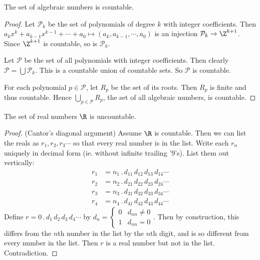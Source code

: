 \documentclass[a4paper]{article}
\begin{document}
  \begin{thm}
    The set of algebraic numbers is countable.
  \end{thm}
  \begin{proof}
    Let $\mathcal{P}_k$ be the set of polynomials of degree $k$ with integer coefficients. Then  $a_kx^k + a_{k - 1}x^{k - 1} + \cdots + a_0 \mapsto (a_k, a_{k - 1}, \cdots, a_0)$ is an injection $\mathcal{P}_k \to \Z^{k + 1}$. Since $\Z^{k + 1}$ is countable, so is $\mathcal{P}_k$.

    Let $\mathcal{P}$ be the set of all polynomials with integer coefficients. Then clearly $\mathcal{P} = \bigcup \mathcal{P}_k$. This is a countable union of countable sets. So $\mathcal{P}$ is countable.

    For each polynomial $p \in \mathcal{P}$, let $R_p$ be the set of its roots. Then $R_p$ is finite and thus countable. Hence $\bigcup_{p\in \mathcal{P}} R_p$, the set of all algebraic numbers, is countable.
  \end{proof}

  \begin{thm}
    The set of real numbers $\R$ is uncountable. 
  \end{thm}

  \begin{proof}
    (Cantor's diagonal argument) Assume $\R$ is countable. Then we can list the reals as $r_1,r_2,r_3\cdots$ so that every real number is in the list. Write each $r_n$ uniquely in decimal form (ie. without infinite trailing '9's). List them out vertically:
    \begin{align*}
      r_1 &= n_1\,.\,d_{11}\,d_{12}\,d_{13}\,d_{14}\cdots\\
      r_2 &= n_2\,.\,d_{21}\,d_{22}\,d_{23}\,d_{24}\cdots\\
      r_3 &= n_3\,.\,d_{31}\,d_{32}\,d_{33}\,d_{34}\cdots\\
      r_4 &= n_4\,.\,d_{41}\,d_{42}\,d_{43}\,d_{44}\cdots
    \end{align*}
    Define $r = 0\,.\,d_1\,d_2\,d_3\,d_4\cdots$ by $d_n = 
    \begin{cases}
      0 & d_{nn}\not= 0\\
      1 & d_{nn}=0
    \end{cases}$. Then by construction, this differs from the $n$th number in the list by the $n$th digit, and is so different from every number in the list. Then $r$ is a real number but not in the list. Contradiction.
  \end{proof}
\end{document}
